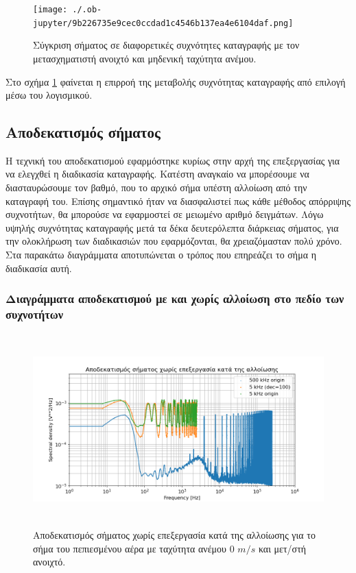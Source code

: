\documentclass[breaklines=true, 12pt]{article}
\begin{document}
{{{\begin{figure}[H]
\centering
\texttt{[image: ./.ob-jupyter/9b226735e9cec0ccdad1c4546b137ea4e6104daf.png]}
\caption{\label{fig:sfreqComp}Σύγκριση σήματος σε διαφορετικές συχνότητες καταγραφής με τον μετασχηματιστή ανοιχτό και μηδενική ταχύτητα ανέμου.}
\end{figure}

Στο σχήμα \ref{fig:sfreqComp} φαίνεται η επιρροή της μεταβολής συχνότητας καταγραφής
από επιλογή μέσω του λογισμικού.
\subsection{Αποδεκατισμός σήματος}
\label{sec:org6a15d45}
\label{sec:decimation-chapter}
Η τεχνική του αποδεκατισμού εφαρμόστηκε κυρίως στην αρχή της επεξεργασίας
για να ελεγχθεί η διαδικασία καταγραφής. Κατέστη αναγκαίο να μπορέσουμε
να διασταυρώσουμε τον βαθμό, που το αρχικό σήμα υπέστη αλλοίωση από την
καταγραφή του. Επίσης σημαντικό ήταν να διασφαλιστεί πως κάθε μέθοδος
απόρριψης συχνοτήτων, θα μπορούσε να εφαρμοστεί σε μειωμένο αριθμό
δειγμάτων. Λόγω υψηλής συχνότητας καταγραφής μετά τα δέκα δευτερόλεπτα
διάρκειας σήματος, για την ολοκλήρωση των διαδικασιών που εφαρμόζονται, θα
χρειαζόμασταν πολύ χρόνο. Στα παρακάτω διαγράμματα αποτυπώνεται ο τρόπος
που επηρεάζει το σήμα η διαδικασία αυτή.
\subsubsection{\textbf{Διαγράμματα αποδεκατισμού με και χωρίς αλλοίωση στο πεδίο των συχνοτήτων}}
\label{sec:org8dd1f8d}
\begin{figure}[htbp]
\centering
\includegraphics[width=500px,height=280px]{./decimation/with_aliasing.png}
\caption{\label{fig:with_al}Αποδεκατισμός σήματος χωρίς επεξεργασία κατά της αλλοίωσης για το σήμα του πεπιεσμένου αέρα με ταχύτητα ανέμου 0 \(m/s\) και μετ/στή ανοιχτό.}
\end{figure}

}}}
\end{document}

